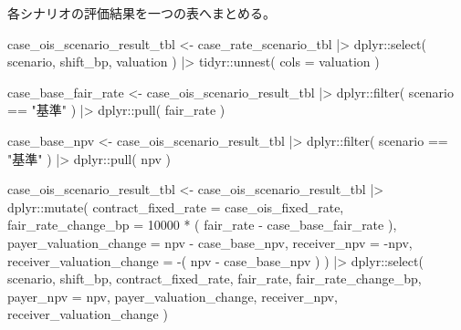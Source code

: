 \documentclass[
  letterpaper,
  DIV=11,
  numbers=noendperiod]{scrreprt}
\newenvironment{Shaded}{\begin{snugshade}}{\end{snugshade}}
\newcommand{\AttributeTok}[1]{\textcolor[rgb]{0.40,0.45,0.13}{#1}}
\newcommand{\DecValTok}[1]{\textcolor[rgb]{0.68,0.00,0.00}{#1}}
\newcommand{\FunctionTok}[1]{\textcolor[rgb]{0.28,0.35,0.67}{#1}}
\newcommand{\NormalTok}[1]{\textcolor[rgb]{0.00,0.23,0.31}{#1}}
\newcommand{\OtherTok}[1]{\textcolor[rgb]{0.00,0.23,0.31}{#1}}
\newcommand{\SpecialCharTok}[1]{\textcolor[rgb]{0.37,0.37,0.37}{#1}}
\newcommand{\StringTok}[1]{\textcolor[rgb]{0.13,0.47,0.30}{#1}}
\begin{document}
各シナリオの評価結果を一つの表へまとめる。

\begin{Shaded}
\begin{Highlighting}[]
\NormalTok{case\_ois\_scenario\_result\_tbl }\OtherTok{\textless{}{-}}\NormalTok{ case\_rate\_scenario\_tbl }\SpecialCharTok{|\textgreater{}}
\NormalTok{  dplyr}\SpecialCharTok{::}\FunctionTok{select}\NormalTok{(}
\NormalTok{    scenario,}
\NormalTok{    shift\_bp,}
\NormalTok{    valuation}
\NormalTok{  ) }\SpecialCharTok{|\textgreater{}}
\NormalTok{  tidyr}\SpecialCharTok{::}\FunctionTok{unnest}\NormalTok{(}
    \AttributeTok{cols =}\NormalTok{ valuation}
\NormalTok{  )}

\NormalTok{case\_base\_fair\_rate }\OtherTok{\textless{}{-}}\NormalTok{ case\_ois\_scenario\_result\_tbl }\SpecialCharTok{|\textgreater{}}
\NormalTok{  dplyr}\SpecialCharTok{::}\FunctionTok{filter}\NormalTok{(}
\NormalTok{    scenario }\SpecialCharTok{==} \StringTok{"基準"}
\NormalTok{  ) }\SpecialCharTok{|\textgreater{}}
\NormalTok{  dplyr}\SpecialCharTok{::}\FunctionTok{pull}\NormalTok{(}
\NormalTok{    fair\_rate}
\NormalTok{  )}

\NormalTok{case\_base\_npv }\OtherTok{\textless{}{-}}\NormalTok{ case\_ois\_scenario\_result\_tbl }\SpecialCharTok{|\textgreater{}}
\NormalTok{  dplyr}\SpecialCharTok{::}\FunctionTok{filter}\NormalTok{(}
\NormalTok{    scenario }\SpecialCharTok{==} \StringTok{"基準"}
\NormalTok{  ) }\SpecialCharTok{|\textgreater{}}
\NormalTok{  dplyr}\SpecialCharTok{::}\FunctionTok{pull}\NormalTok{(}
\NormalTok{    npv}
\NormalTok{  )}

\NormalTok{case\_ois\_scenario\_result\_tbl }\OtherTok{\textless{}{-}}\NormalTok{ case\_ois\_scenario\_result\_tbl }\SpecialCharTok{|\textgreater{}}
\NormalTok{  dplyr}\SpecialCharTok{::}\FunctionTok{mutate}\NormalTok{(}
    \AttributeTok{contract\_fixed\_rate =}\NormalTok{ case\_ois\_fixed\_rate,}
    \AttributeTok{fair\_rate\_change\_bp =} \DecValTok{10000} \SpecialCharTok{*}\NormalTok{ (}
\NormalTok{      fair\_rate }\SpecialCharTok{{-}}
\NormalTok{        case\_base\_fair\_rate}
\NormalTok{    ),}
    \AttributeTok{payer\_valuation\_change =}
\NormalTok{      npv }\SpecialCharTok{{-}}
\NormalTok{      case\_base\_npv,}
    \AttributeTok{receiver\_npv =} \SpecialCharTok{{-}}\NormalTok{npv,}
    \AttributeTok{receiver\_valuation\_change =}
      \SpecialCharTok{{-}}\NormalTok{(}
\NormalTok{        npv }\SpecialCharTok{{-}}
\NormalTok{          case\_base\_npv}
\NormalTok{      )}
\NormalTok{  ) }\SpecialCharTok{|\textgreater{}}
\NormalTok{  dplyr}\SpecialCharTok{::}\FunctionTok{select}\NormalTok{(}
\NormalTok{    scenario,}
\NormalTok{    shift\_bp,}
\NormalTok{    contract\_fixed\_rate,}
\NormalTok{    fair\_rate,}
\NormalTok{    fair\_rate\_change\_bp,}
    \AttributeTok{payer\_npv =}\NormalTok{ npv,}
\NormalTok{    payer\_valuation\_change,}
\NormalTok{    receiver\_npv,}
\NormalTok{    receiver\_valuation\_change}
\NormalTok{  )}


\end{Highlighting}
\end{Shaded}
\end{document}
